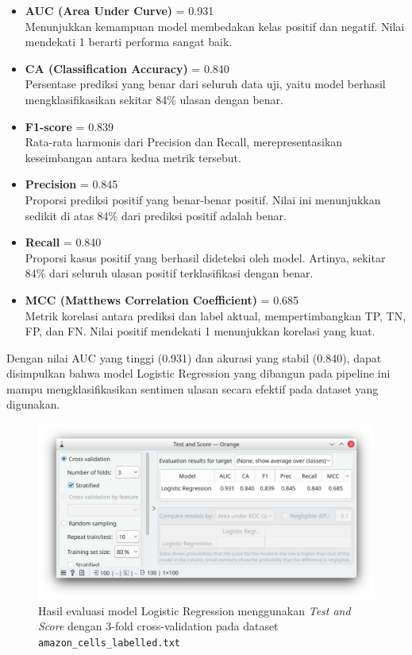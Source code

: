 \begin{itemize}
	\item \textbf{AUC (Area Under Curve)} = 0.931 \\
	Menunjukkan kemampuan model membedakan kelas positif dan negatif. Nilai mendekati 1 berarti performa sangat baik.
	
	\item \textbf{CA (Classification Accuracy)} = 0.840 \\
	Persentase prediksi yang benar dari seluruh data uji, yaitu model berhasil mengklasifikasikan sekitar 84\% ulasan dengan benar.
	
	\item \textbf{F1-score} = 0.839 \\
	Rata-rata harmonis dari Precision dan Recall, merepresentasikan keseimbangan antara kedua metrik tersebut.
	
	\item \textbf{Precision} = 0.845 \\
	Proporsi prediksi positif yang benar-benar positif. Nilai ini menunjukkan sedikit di atas 84\% dari prediksi positif adalah benar.
	
	\item \textbf{Recall} = 0.840 \\
	Proporsi kasus positif yang berhasil dideteksi oleh model. Artinya, sekitar 84\% dari seluruh ulasan positif terklasifikasi dengan benar.
	
	\item \textbf{MCC (Matthews Correlation Coefficient)} = 0.685 \\
	Metrik korelasi antara prediksi dan label aktual, mempertimbangkan TP, TN, FP, dan FN. Nilai positif mendekati 1 menunjukkan korelasi yang kuat.
\end{itemize}

Dengan nilai AUC yang tinggi (0.931) dan akurasi yang stabil (0.840), dapat disimpulkan bahwa model Logistic Regression yang dibangun pada pipeline ini mampu mengklasifikasikan sentimen ulasan secara efektif pada dataset yang digunakan.

\begin{figure}[h]
	\centering
	\includegraphics[width=0.75\linewidth]{../figures/sentiment_test.png}
	\caption{Hasil evaluasi model Logistic Regression menggunakan \textit{Test and Score} dengan 3-fold cross-validation pada dataset \texttt{amazon\_cells\_labelled.txt}}
	\label{fig:sentiment-testscore}
\end{figure}

